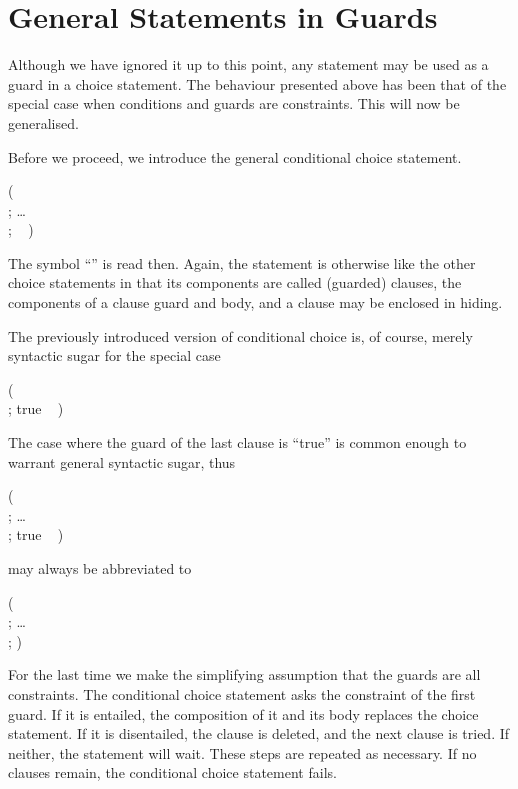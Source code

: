 \section{General Statements in Guards}

Although we have ignored it up to this point, any statement may be
used as a guard in a choice statement.  The behaviour presented above
has been that of the special case when conditions and guards are
constraints.  This will now be generalised.

Before we proceed, we introduce the general conditional choice statement.
%
\begin{progex}
(  \cond\  \\
; \dots \\
;  \cond\  )
\end{progex}%
%
The symbol ``{\prog \cond}'' is read then.  Again, the statement is
otherwise like the other choice statements in that its components are
called (guarded) clauses, the components of a clause guard and body,
and a clause may be enclosed in hiding.

The previously introduced version of conditional choice is, of course,
merely syntactic sugar for the special case
%
\begin{progex}
(  \cond\  \\
; true \cond\  )
\end{progex}%
%
The case where the guard of the last clause is ``{\prog true}'' is
common enough to warrant general syntactic sugar, thus
%
\begin{progex}
(  \cond\  \\
; \dots \\
; true \cond\  )
\end{progex}%
%
may always be abbreviated to
%
\begin{progex}
(  \cond\  \\
; \dots \\
;  )
\end{progex}%
%
For the last time we make the simplifying assumption that the guards
are all constraints.  The conditional choice statement asks the
constraint of the first guard.  If it is entailed, the composition of
it and its body replaces the choice statement.  If it is disentailed,
the clause is deleted, and the next clause is tried.  If neither, the
statement will wait.  These steps are repeated as necessary.  If no
clauses remain, the conditional choice statement fails.

